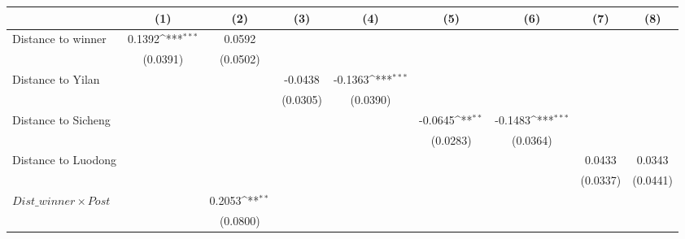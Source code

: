 {
\def\sym#1{\ifmmode^{#1}\else\(^{#1}\)\fi}
\begin{tabular}{l*{8}{c}}
\toprule
                &\multicolumn{1}{c}{(1)}         &\multicolumn{1}{c}{(2)}         &\multicolumn{1}{c}{(3)}         &\multicolumn{1}{c}{(4)}         &\multicolumn{1}{c}{(5)}         &\multicolumn{1}{c}{(6)}         &\multicolumn{1}{c}{(7)}         &\multicolumn{1}{c}{(8)}         \\
\midrule
Distance to winner&   0.1392\sym{***}&   0.0592         &                  &                  &                  &                  &                  &                  \\
                & (0.0391)         & (0.0502)         &                  &                  &                  &                  &                  &                  \\
\addlinespace
Distance to Yilan&                  &                  &  -0.0438         &  -0.1363\sym{***}&                  &                  &                  &                  \\
                &                  &                  & (0.0305)         & (0.0390)         &                  &                  &                  &                  \\
\addlinespace
Distance to Sicheng&                  &                  &                  &                  &  -0.0645\sym{**} &  -0.1483\sym{***}&                  &                  \\
                &                  &                  &                  &                  & (0.0283)         & (0.0364)         &                  &                  \\
\addlinespace
Distance to Luodong&                  &                  &                  &                  &                  &                  &   0.0433         &   0.0343         \\
                &                  &                  &                  &                  &                  &                  & (0.0337)         & (0.0441)         \\
\addlinespace
$ Dist\_winner \times Post$&                  &   0.2053\sym{**} &                  &                  &                  &                  &                  &                  \\
                &                  & (0.0800)         &                  &                  &                  &                  &                  &                  \\

\end{tabular}}
